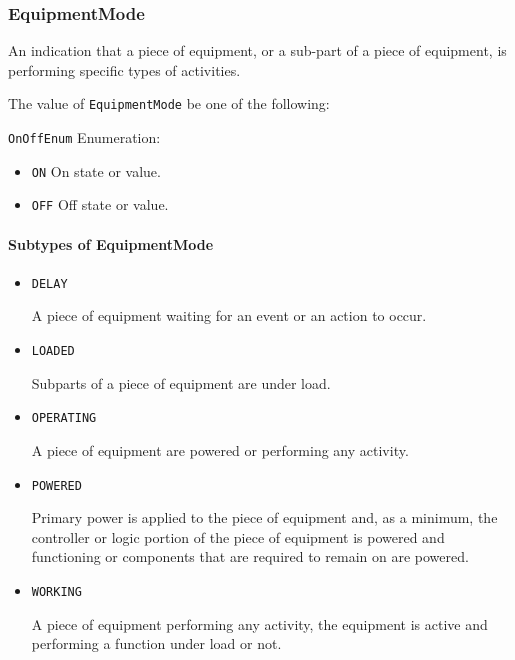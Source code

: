 \subsubsection{EquipmentMode}
\label{sec:EquipmentMode}



An indication that a piece of equipment, or a sub-part of a piece of equipment, is performing specific types of activities.


The value of \texttt{EquipmentMode} \MUST be one of the following: 


\texttt{OnOffEnum} Enumeration:

\begin{itemize}
\item \texttt{ON} \newline On state or value. 
\item \texttt{OFF} \newline Off state or value. 
\end{itemize}

\FloatBarrier

\paragraph{Subtypes of EquipmentMode}\mbox{}
\label{sec:Subtypes of EquipmentMode}

\begin{itemize}

\item \texttt{DELAY}


A piece of equipment waiting for an event or an action to occur.

\item \texttt{LOADED}


Subparts of a piece of equipment are under load.

\item \texttt{OPERATING}


A piece of equipment are powered or performing any activity.

\item \texttt{POWERED}


Primary  power is  applied  to the  piece  of  equipment and,  as  a minimum, the controller or logic portion of the piece of equipment is powered and functioning or components that are required to remain on are powered.

\item \texttt{WORKING}


A piece of equipment performing any activity, the equipment is active and performing a function under load or not.


\end{itemize}

